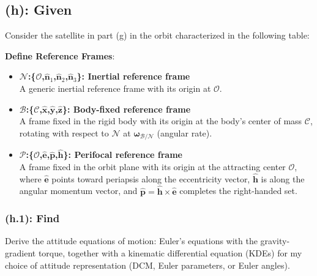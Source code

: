 \documentclass[titlepage]{article}
\begin{document}
\subsection*{(h): Given}
Consider the satellite in part (g) in the orbit characterized in the following table:
\begin{table}[H]
	\centering
	\caption{Reference orbit}
	\label{tab:reference_orbit}
\end{table}

\textbf{Define Reference Frames}:
\begin{itemize}
	\item \textbf{$\mathcal{N}$:\{$\mathcal{O}$,$\hat{\boldsymbol{n}}_1$,$\hat{\boldsymbol{n}}_2$,$\hat{\boldsymbol{n}}_3$\}: Inertial reference frame\\}A generic inertial reference frame with its origin at $\mathcal{O}$.
	\item \textbf{$\mathcal{B}$:\{$\mathcal{C}$,$\hat{\boldsymbol{x}}$,$\hat{\boldsymbol{y}}$,$\hat{\boldsymbol{z}}$\}: Body-fixed reference frame\\}A frame fixed in the rigid body with its origin at the body's center of mass $\mathcal{C}$, rotating with respect to $\mathcal{N}$ at $\boldsymbol{\omega}_{\mathcal{B}/\mathcal{N}}$ (angular rate).
	\item \textbf{$\mathcal{P}$:\{$\mathcal{O}$,$\hat{\boldsymbol{e}}$,$\hat{\boldsymbol{p}}$,$\hat{\boldsymbol{h}}$\}: Perifocal reference frame\\}A frame fixed in the orbit plane with its origin at the attracting center $\mathcal{O}$, where $\hat{\boldsymbol{e}}$ points toward periapsis along the eccentricity vector, $\hat{\boldsymbol{h}}$ is along the angular momentum vector, and $\hat{\boldsymbol{p}}=\hat{\boldsymbol{h}}\times\hat{\boldsymbol{e}}$ completes the right-handed set.
\end{itemize}

\subsubsection*{(h.1): Find}
Derive the attitude equations of motion: Euler's equations with the gravity-gradient torque, together with a kinematic differential equation (KDEs) for my choice of attitude representation (DCM, Euler parameters, or Euler angles).\\
\end{document}
